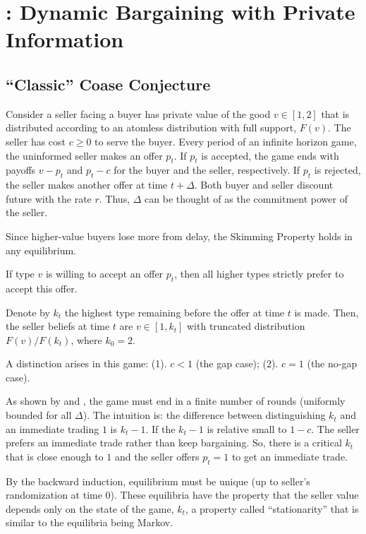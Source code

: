 \documentclass[11pt]{elegantbook}
\begin{document}
\chapter{\cite{fuchs2022dynamic}: Dynamic Bargaining with Private Information}

\section{``Classic'' Coase Conjecture}
Consider a seller facing a buyer has private value of the good $v\in[1,2]$ that is distributed according to an atomless distribution with full support, $F(v)$. The seller has cost $c\geq 0$ to serve the buyer. Every period of an infinite horizon game, the uninformed seller makes an offer $p_t$. If $p_t$ is accepted, the game ends with payoffs $v-p_t$ and $p_t-c$ for the buyer and the seller, respectively. If $p_t$ is rejected, the seller makes another offer at time $t+\Delta$. Both buyer and seller discount future with the rate $r$. Thus, $\Delta$ can be thought of as the commitment power of the seller.

Since higher-value buyers lose more from delay, the Skimming Property holds in any equilibrium.
\begin{lemma}
    If type $v$ is willing to accept an offer $p_t$, then all higher types strictly prefer to accept this offer.
\end{lemma}
Denote by $k_t$ the highest type remaining before the offer at time $t$ is made. Then, the seller beliefs at time $t$ are $v\in[1,k_t]$ with truncated distribution $F(v)/F(k_t)$, where $k_0=2$.


A distinction arises in this game: (1). $c<1$ (the gap case); (2). $c=1$ (the no-gap case).

As shown by \cite{fudenberg1985infinite} and \cite{gul1986foundations}, the game must end in a finite number of rounds (uniformly bounded for all $\Delta$). The intuition is: the difference between distinguishing $k_t$ and an immediate trading $1$ is $k_t-1$. If the $k_t-1$ is relative small to $1-c$. The seller prefers an immediate trade rather than keep bargaining. So, there is a critical $k_t$ that is close enough to $1$ and the seller offers $p_t=1$ to get an immediate trade.

By the backward induction, equilibrium must be unique (up to seller's randomization at time $0$). These equilibria have the property that the seller value depends only on the state of the game, $k_t$, a property called ``stationarity'' that is similar to the equilibria being Markov.
\end{document}
